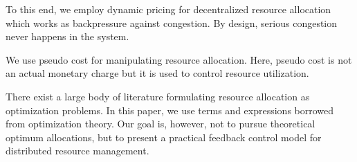 To this end, we employ dynamic pricing for decentralized resource
allocation which works as backpressure against congestion.
By design, serious congestion never happens in the system.

We use pseudo cost for manipulating resource allocation.
Here, pseudo cost is not an actual monetary charge but it is used to
control resource utilization.

There exist a large body of literature formulating resource allocation
as optimization problems.
In this paper, we use terms and expressions borrowed from optimization
theory. Our goal is, however, not to pursue theoretical optimum
allocations, but to present a practical feedback control model for
distributed resource management.


